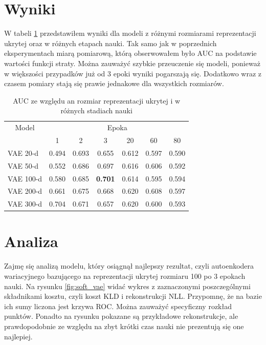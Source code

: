 \section{Wyniki}

W tabeli \ref{table:results} przedstawiłem wyniki dla modeli z różnymi rozmiarami reprezentacji ukrytej oraz w różnych etapach nauki. Tak samo jak w poprzednich eksperymentach miarą pomiarową, którą obserwowałem było AUC na podstawie wartości funkcji straty. Można zauważyć szybkie przeuczenie się modeli, ponieważ w większości przypadków już od 3 epoki wyniki pogarszają się. Dodatkowo wraz z czasem pomiary stają się prawie jednakowe dla wszystkich rozmiarów. 

\begin{table}[h!]
	\centering
    \begin{tabular}{ l | c c c c c c }
 
    \multicolumn{1}{c}{Model} & \multicolumn{6}{c}{Epoka} \\
    \cmidrule(r){1-1} \cmidrule(r){2-7}
     		& 1 & 2 & 3 & 20 & 60 & 80 \\ \cmidrule(r){2-7}
    VAE 20-d 	& 0.494 & 0.693 & 0.655 & 0.612 & 0.597 & 0.590 \\ \hline
    VAE 50-d 	& 0.552 & 0.686 & 0.697 & 0.616 & 0.606 & 0.592 \\ \hline
    VAE 100-d 	& 0.580 & 0.685 & \textbf{0.701} & 0.614 & 0.595 & 0.594 \\ \hline
    VAE 200-d   & 0.661 & 0.675 & 0.668 & 0.620 & 0.608 & 0.597 \\ \hline
    VAE 300-d   & 0.704 & 0.671 & 0.657 & 0.620 & 0.600 & 0.593 \\
    \toprule
    \end{tabular}
    \caption{AUC ze względu an rozmiar reprezentacji ukrytej i w różnych stadiach nauki}
	\label{table:results}
\end{table}

\section{Analiza}

Zajmę się analizą modelu, który osiągnął najlepszy rezultat, czyli autoenkodera wariacyjnego bazującego na reprezentacji ukrytej rozmiaru 100 po 3 epokach nauki. Na rysunku \ref{fig:soft_vae} widać wykres z zaznaczonymi poszczególnymi składnikami kosztu, czyli koszt KLD i rekonstrukcji NLL. Przypomnę, że na bazie ich sumy liczona jest krzywa ROC. Można zauważyć specyficzny rozkład punktów. Ponadto na rysunku pokazane są przykładowe rekonstrukcje, ale prawdopodobnie ze względu na zbyt krótki czas nauki nie prezentują się one najlepiej.

